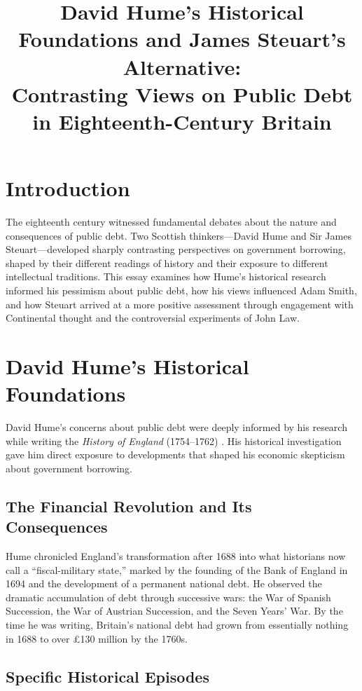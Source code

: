 \documentclass[12pt]{article}
\title{David Hume's Historical Foundations and James Steuart's Alternative:\\Contrasting Views on Public Debt in Eighteenth-Century Britain}
\author{}
\date{}
\begin{document}
\maketitle


\section{Introduction}

The eighteenth century witnessed fundamental debates about the nature and consequences of public debt. Two Scottish thinkers—David Hume and Sir James Steuart—developed sharply contrasting perspectives on government borrowing, shaped by their different readings of history and their exposure to different intellectual traditions. This essay examines how Hume's historical research informed his pessimism about public debt, how his views influenced Adam Smith, and how Steuart arrived at a more positive assessment through engagement with Continental thought and the controversial experiments of John Law.

\section{David Hume's Historical Foundations}

David Hume's concerns about public debt were deeply informed by his research while writing the \textit{History of England} (1754--1762) \citep{hume1754history}. His historical investigation gave him direct exposure to developments that shaped his economic skepticism about government borrowing.

\subsection{The Financial Revolution and Its Consequences}

Hume chronicled England's transformation after 1688 into what historians now call a ``fiscal-military state,'' marked by the founding of the Bank of England in 1694 and the development of a permanent national debt. He observed the dramatic accumulation of debt through successive wars: the War of Spanish Succession, the War of Austrian Succession, and the Seven Years' War. By the time he was writing, Britain's national debt had grown from essentially nothing in 1688 to over £130 million by the 1760s.

\subsection{Specific Historical Episodes}
\end{document}

